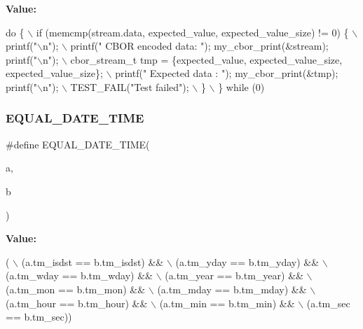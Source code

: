 {\bfseries Value\+:}
\begin{DoxyCode}
\textcolor{keywordflow}{do} \{ \(\backslash\)
    if (memcmp(stream.data, expected\_value, expected\_value\_size) != 0) \{ \(\backslash\)
        printf(\textcolor{stringliteral}{"\(\backslash\)n"}); \(\backslash\)
        printf(\textcolor{stringliteral}{"  CBOR encoded data: "}); my\_cbor\_print(&stream); printf(\textcolor{stringliteral}{"\(\backslash\)n"}); \(\backslash\)
        cbor\_stream\_t tmp = \{expected\_value, expected\_value\_size, expected\_value\_size\}; \(\backslash\)
        printf(\textcolor{stringliteral}{"  Expected data    : "}); my\_cbor\_print(&tmp); printf(\textcolor{stringliteral}{"\(\backslash\)n"}); \(\backslash\)
        TEST\_FAIL(\textcolor{stringliteral}{"Test failed"}); \(\backslash\)
    \} \(\backslash\)
\} \textcolor{keywordflow}{while} (0)
\end{DoxyCode}
\mbox{\label{tests-cbor_8c_a2bf61b15c14a09a99cd2fe190cddb01c}} 
\subsubsection{\texorpdfstring{E\+Q\+U\+A\+L\+\_\+\+D\+A\+T\+E\+\_\+\+T\+I\+ME}{EQUAL\_DATE\_TIME}}
{\footnotesize\ttfamily \#define E\+Q\+U\+A\+L\+\_\+\+D\+A\+T\+E\+\_\+\+T\+I\+ME(\begin{DoxyParamCaption}\item[{}]{a,  }\item[{}]{b }\end{DoxyParamCaption})}

{\bfseries Value\+:}
\begin{DoxyCode}
( \(\backslash\)
    (a.tm\_isdst == b.tm\_isdst) && \(\backslash\)
    (a.tm\_yday == b.tm\_yday) && \(\backslash\)
    (a.tm\_wday == b.tm\_wday) && \(\backslash\)
    (a.tm\_year == b.tm\_year) && \(\backslash\)
    (a.tm\_mon == b.tm\_mon) && \(\backslash\)
    (a.tm\_mday == b.tm\_mday) && \(\backslash\)
    (a.tm\_hour == b.tm\_hour) && \(\backslash\)
    (a.tm\_min == b.tm\_min) && \(\backslash\)
    (a.tm\_sec == b.tm\_sec))
\end{DoxyCode}
\mbox{\label{tests-cbor_8c_a23cd433698bdb7a2cf5adf6c7a1a0f5c}} 
